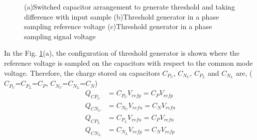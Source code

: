 \begin{figure}[h!]
\qquad
{}
\caption{(a)Switched capacitor arrangement to generate threshold and taking difference with input sample (b)Threshold generator in a phase sampling reference voltage (c)Threshold generator in a phase sampling signal voltage}
\label{fig:switched_cap}
\end{figure}
%
In the Fig. \ref{fig:switched_cap}(a), the configuration of threshold generator is shown where the reference voltage is sampled on the capacitors with respect to the common mode voltage. Therefore, the charge stored on capacitors $C_{P_{U}}$, $C_{N_{U}}$, $C_{P_{L}}$ and $C_{N_{L}}$ are, ($C_{P_{U}}$=$C_{P_{L}}$=$C_P$, $C_{N_{U}}$=$C_{N_{L}}$=$C_N$)
%
\begin{equation}
    \begin{split}
        Q_{CP_{U}} &= C_{P_{U}}V_{refp} =C_PV_{refp}\\
        Q_{CN_{U}} &= C_{N_{U}}V_{refn} =C_NV_{refn}\\
        Q_{CP_{L}} &= C_{P_{L}}V_{refn} =C_PV_{refn}\\
        Q_{CN_{L}} &= C_{N_{L}}V_{refp} =C_NV_{refp}
    \end{split}
\end{equation}
